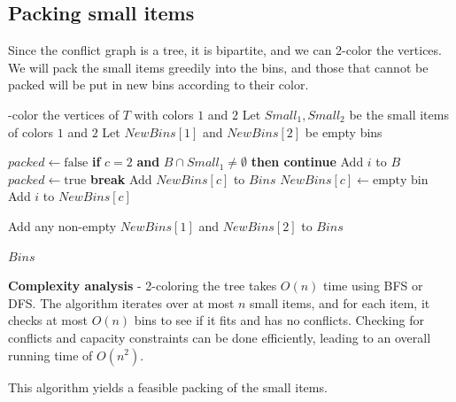 \subsection*{Packing small items}
Since the conflict graph is a tree, it is bipartite, and we can 2-color the vertices. We will pack the small items greedily into the bins, and those that cannot be packed will be put in new bins according to their color.

\begin{algorithm}
  \caption{Packing small items for Bin Packing with Trees}
  \begin{algorithmic}[1]
      -color the vertices of $T$ with colors $1$ and $2$
      \State Let $Small_1, Small_2$ be the small items of colors $1$ and $2$
      \State Let $NewBins[1]$ and $NewBins[2]$ be empty bins

          \State $packed \gets \text{false}$
            \State \textbf{if} $c = 2$ \textbf{and} $B \cap Small_1 \neq \emptyset$ \textbf{then continue}
              \State Add $i$ to $B$
              \State $packed \gets \text{true}$
              \State \textbf{break}
            \EndIf
          \EndFor
              \State Add $NewBins[c]$ to $Bins$
              \State $NewBins[c] \gets \text{empty bin}$
            \EndIf
            \State Add $i$ to $NewBins[c]$
          \EndIf
        \EndFor
      \EndFor

      \State Add any non-empty $NewBins[1]$ and $NewBins[2]$ to $Bins$

      \State \Return $Bins$
    \EndProcedure
  \end{algorithmic}
\end{algorithm}

\textbf{Complexity analysis} - 2-coloring the tree takes $O(n)$ time using BFS or DFS. The algorithm iterates over at most $n$ small items, and for each item, it checks at most $O(n)$ bins to see if it fits and has no conflicts. Checking for conflicts and capacity constraints can be done efficiently, leading to an overall running time of $O(n^2)$.

\begin{claim}
This algorithm yields a feasible packing of the small items.
\end{claim}

